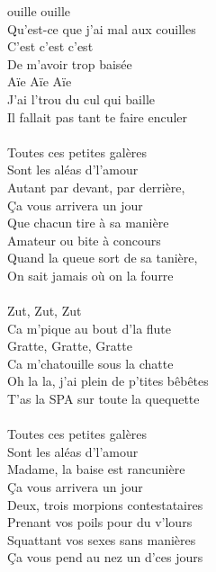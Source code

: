 
 ouille ouille
\\Qu'est-ce que j'ai mal aux couilles
\\C'est c'est c'est
\\De m'avoir trop baisée
\\Aïe Aïe Aïe
\\J'ai l'trou du cul qui baille
\\Il fallait pas tant te faire enculer \bissimple
\\\\Toutes ces petites galères
\\Sont les aléas d'l'amour
\\Autant par devant, par derrière,
\\Ça vous arrivera un jour
\\Que chacun tire à sa manière
\\Amateur ou bite à concours
\\Quand la queue sort de sa tanière,
\\On sait jamais où on la fourre
\\\\Zut, Zut, Zut
\\Ca m'pique au bout d'la flute
\\Gratte, Gratte, Gratte
\\Ca m'chatouille sous la chatte
\\Oh la la, j'ai plein de p'tites bêbêtes
\\T'as la SPA sur toute la quequette \bissimple
\\\\Toutes ces petites galères
\\Sont les aléas d'l'amour
\\Madame, la baise est rancunière
\\Ça vous arrivera un jour
\\Deux, trois morpions contestataires
\\Prenant vos poils pour du v'lours
\\Squattant vos sexes sans manières
\\Ça vous pend au nez un d'ces jours
